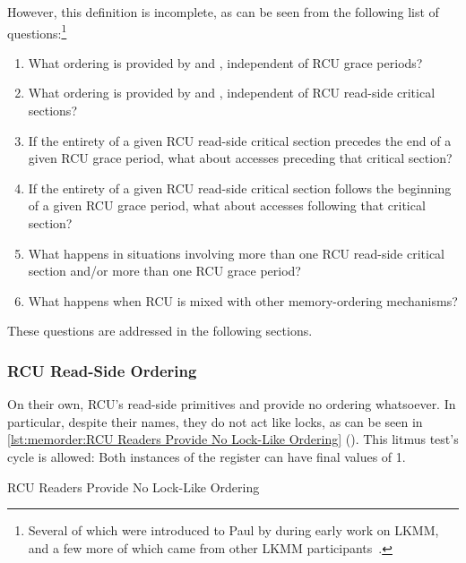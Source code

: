 However, this definition is incomplete, as can be seen from the following
list of questions:\footnote{
	Several of which were introduced to Paul by  during
	early work on LKMM, and a few more of which came from other
	LKMM participants~\cite{Alglave:2018:FSC:3173162.3177156}.}

\begin{enumerate}
\item	What ordering is provided by 
	and , independent of RCU grace periods?
\item	What ordering is provided by 
	and , independent of RCU read-side
	critical sections?
\item	If the entirety of a given RCU read-side critical section
	precedes the end of a given RCU grace period, what about
	accesses preceding that critical section?
\item	If the entirety of a given RCU read-side critical section
	follows the beginning of a given RCU grace period, what about
	accesses following that critical section?
\item	What happens in situations involving more than one RCU read-side
	critical section and/or more than one RCU grace period?
\item	What happens when RCU is mixed with other memory-ordering
	mechanisms?
\end{enumerate}

These questions are addressed in the following sections.

\subsubsection{RCU Read-Side Ordering}
\label{sec:memorder:RCU Read-Side Ordering}

On their own, RCU's read-side primitives  and
 provide no ordering whatsoever.
In particular, despite their names, they do not act like locks, as can
be seen in
\cref{lst:memorder:RCU Readers Provide No Lock-Like Ordering}
().
This litmus test's cycle is allowed: Both instances of the 
register can have final values of 1.

\begin{listing}[tbp]

\caption{RCU Readers Provide No Lock-Like Ordering}
\label{lst:memorder:RCU Readers Provide No Lock-Like Ordering}
\end{listing}

